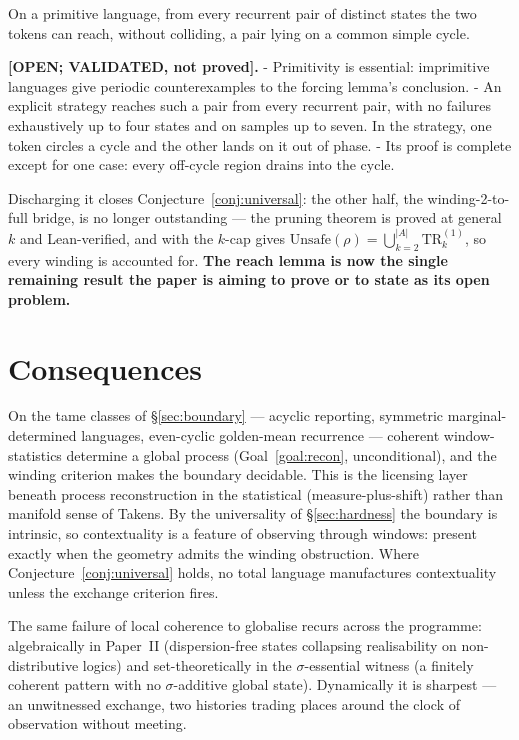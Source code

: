 \begin{namedlemma}\label{lem:reach}
On a primitive language, from every recurrent pair of distinct states the two
tokens can reach, without colliding, a pair lying on a common simple cycle.
\end{namedlemma}

\noindent\textbf{[OPEN; VALIDATED, not proved].}
- Primitivity is essential: imprimitive languages give periodic counterexamples
  to the forcing lemma's conclusion.
- An explicit strategy reaches such a pair from every recurrent pair, with no
  failures exhaustively up to four states and on samples up to seven. In the
  strategy, one token circles a cycle and the other lands on it out of phase.
- Its proof is complete except for one case: every off-cycle region drains
  into the cycle.

Discharging it closes
Conjecture~\ref{conj:universal}: the other half, the winding-2-to-full bridge, is
no longer outstanding --- the pruning theorem is proved at general $k$ and
Lean-verified, and with the $k$-cap gives
$\mathrm{Unsafe}(\rho)=\bigcup_{k=2}^{|A|}\mathrm{TR}_k^{(1)}$, so every winding
is accounted for. \textbf{The reach lemma is now the single remaining result
the paper is aiming to prove or to state as its open problem.}


\section{Consequences}\label{sec:consequences}

On the tame classes of \S\ref{sec:boundary} --- acyclic reporting, symmetric
marginal-determined languages, even-cyclic golden-mean recurrence --- coherent
window-statistics determine a global process (Goal~\ref{goal:recon},
unconditional), and the winding criterion makes the boundary decidable. This is the
licensing layer beneath process reconstruction in the statistical (measure-plus-shift)
rather than manifold sense of Takens. By the universality of \S\ref{sec:hardness}
the boundary is intrinsic, so contextuality is a feature of observing through
windows: present exactly when the geometry admits the winding obstruction. Where
Conjecture~\ref{conj:universal} holds, no total language manufactures contextuality
unless the exchange criterion fires.

The same failure of local coherence to globalise recurs across the programme:
algebraically in Paper~II (dispersion-free states collapsing realisability on
non-distributive logics) and set-theoretically in the $\sigma$-essential witness
(a finitely coherent pattern with no $\sigma$-additive global state). Dynamically
it is sharpest --- an unwitnessed exchange, two histories trading places around the
clock of observation without meeting.


